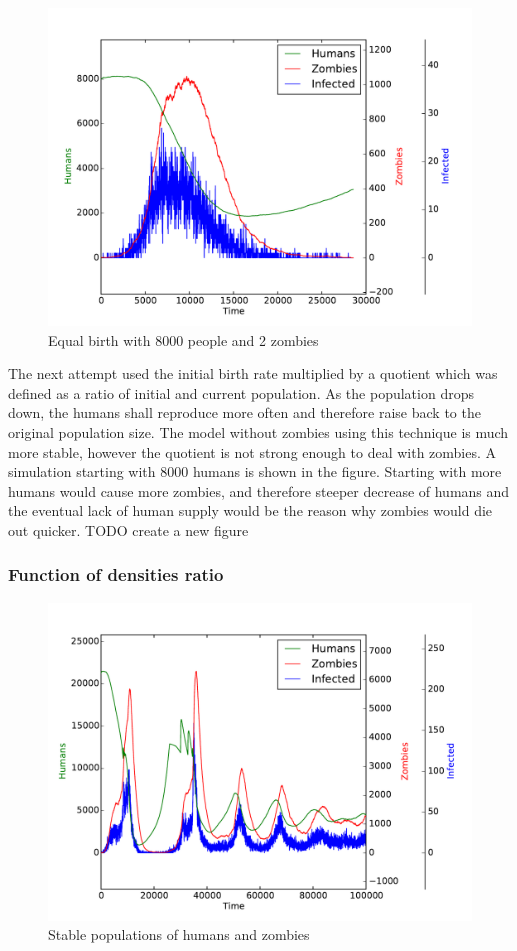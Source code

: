\documentclass[a4paper]{article}
\begin{document}
\begin{figure}[pht]
    \centering
    \includegraphics[width=\textwidth]{equal_birth_8000}
    \caption{Equal birth with 8000 people and 2 zombies}
\end{figure}

The next attempt used the initial birth rate multiplied by a quotient which was defined as a ratio of initial and current population.
As the population drops down, the humans shall reproduce more often and therefore raise back to the original population size.
The model without zombies using this technique is much more stable, however the quotient is not strong enough to deal with zombies.
A simulation starting with 8000 humans is shown in the figure.
Starting with more humans would cause more zombies, and therefore steeper decrease of humans and the eventual lack of human supply would be the reason why zombies would die out quicker.
TODO create a new figure

\subsubsection{Function of densities ratio}

\begin{figure}[pht]
    \centering
    \includegraphics[width=\textwidth]{stable}
    \caption{Stable populations of humans and zombies}
\end{figure}
\end{document}

